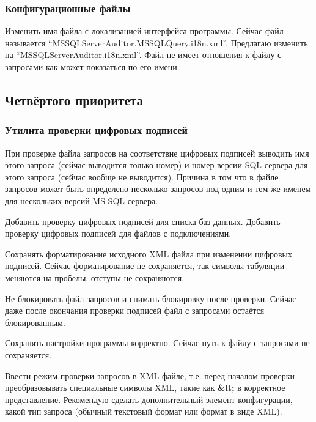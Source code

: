 \subsubsection{Конфигурационные файлы}

Изменить имя файла с локализацией интерфейса программы. Сейчас файл называется
``MSSQL\-Server\-Auditor.\-MSSQLQuery.\-i18n.\-xml''. Предлагаю изменить на
``MSSQL\-Server\-Auditor.\-i18n.\-xml''. Файл не имеет отношения к файлу с запросами как может
показаться по его имени.

\subsection{Четвёртого приоритета}

\subsubsection{Утилита проверки цифровых подписей}

При проверке файла запросов на соответствие цифровых подписей выводить имя этого запроса (сейчас
выводится только номер) и номер версии SQL сервера для этого запроса (сейчас вообще не выводится).
Причина в том что в файле запросов может быть определено несколько запросов под одним и тем же
именем для нескольких версий MS SQL сервера.

\bigskip

Добавить проверку цифровых подписей для списка баз данных. Добавить проверку цифровых подписей для
файлов с подключениями.

\bigskip

Сохранять форматирование исходного XML файла при изменении цифровых подписей. Сейчас форматирование
не сохраняется, так символы табуляции меняются на пробелы, отступы не сохраняются.

\bigskip

Не блокировать файл запросов и снимать блокировку после проверки. Сейчас даже после окончания
проверки подписей файл с запросами остаётся блокированным.

\bigskip

Сохранять настройки программы корректно. Сейчас путь к файлу с запросами не сохраняется.

\bigskip

Ввести режим проверки запросов в XML файле, т.е. перед началом проверки преобразовывать специальные
символы XML, такие как \textbf{\&lt;} в корректное представление. Рекомендую сделать дополнительный
элемент конфигурации, какой тип запроса (обычный текстовый формат или формат в виде XML).

